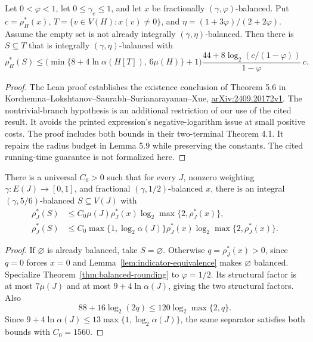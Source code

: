 \begin{theorem}
\label{thm:balanced-rounding}
\leanok
Let $0<\varphi<1$, let $0\le\gamma_e\le1$, and let $x$ be fractionally
$(\gamma,\varphi)$-balanced. Put $c=\rho_H^*(x)$,
$T=\{v\in V(H):x(v)\ne0\}$, and
$\eta=(1+3\varphi)/(2+2\varphi)$. Assume the empty set is not already
integrally $(\gamma,\eta)$-balanced. Then there is $S\subseteq T$ that is
integrally $(\gamma,\eta)$-balanced with
\[
 \rho_H^*(S)\le
 \bigl(\min\{8+4\ln\alpha(H[T]),\,6\mu(H)\}+1\bigr)
 \frac{44+8\log_2(c/(1-\varphi))}{1-\varphi}\,c.
\]
\end{theorem}

\begin{proof}\leanok
The Lean proof establishes the existence conclusion of Theorem 5.6 in
Korchemna--Lokshtanov--Saurabh--Surianarayanan--Xue,
\href{https://arxiv.org/abs/2409.20172v1}{arXiv:2409.20172v1}.
The nontrivial-branch hypothesis is an additional restriction of our use of
the cited result. It avoids the
printed expression's negative-logarithm issue at small positive costs.
The proof includes both bounds in their two-terminal Theorem 4.1.
It repairs the radius budget in Lemma 5.9 while preserving the constants.
The cited running-time guarantee is not formalized here.
\end{proof}

\begin{proposition}
\label{thm:rounding}
\leanok
There is a universal $C_0>0$ such that for every $J$, nonzero weighting
$\gamma:E(J)\to[0,1]$, and fractional $(\gamma,1/2)$-balanced $x$,
there is an integral $(\gamma,5/6)$-balanced $S\subseteq V(J)$ with
\[
 \begin{aligned}
 \rho_J^*(S)&\le C_0\mu(J)\rho_J^*(x)
      \log_2\max\{2,\rho_J^*(x)\},\\
 \rho_J^*(S)&\le C_0\max\{1,\log_2\alpha(J)\}\rho_J^*(x)
      \log_2\max\{2,\rho_J^*(x)\}.
 \end{aligned}
\]
\end{proposition}
\begin{proof}\leanok
If $\varnothing$ is already balanced, take $S=\varnothing$. Otherwise
$q=\rho_J^*(x)>0$, since $q=0$ forces $x=0$ and
Lemma~\ref{lem:indicator-equivalence} makes $\varnothing$ balanced.
Specialize Theorem~\ref{thm:balanced-rounding} to $\varphi=1/2$. Its
structural factor is at most $7\mu(J)$ and at most
$9+4\ln\alpha(J)$, giving the two structural factors.
Also
\[
 88+16\log_2(2q)\le120\log_2\max\{2,q\}.
\]
Since $9+4\ln\alpha(J)\le13\max\{1,\log_2\alpha(J)\}$,
the same separator satisfies both bounds with $C_0=1560$.
\end{proof}

